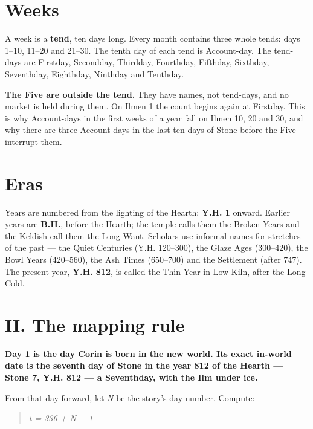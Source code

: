 \documentclass{design/chronicle}
\begin{document}
\section*{Weeks}

A week is a \textbf{tend}, ten days long. Every month contains three whole tends: days 1–10, 11–20 and 21–30. The tenth day of each tend is Account-day. The tend-days are Firstday, Secondday, Thirdday, Fourthday, Fifthday, Sixthday, Seventhday, Eighthday, Ninthday and Tenthday.

\textbf{The Five are outside the tend.} They have names, not tend-days, and no market is held during them. On Ilmen 1 the count begins again at Firstday. This is why Account-days in the first weeks of a year fall on Ilmen 10, 20 and 30, and why there are three Account-days in the last ten days of Stone before the Five interrupt them.

\section*{Eras}

Years are numbered from the lighting of the Hearth: \textbf{Y.H. 1} onward. Earlier years are \textbf{B.H.}, before the Hearth; the temple calls them the Broken Years and the Keldish call them the Long Want. Scholars use informal names for stretches of the past — the Quiet Centuries (Y.H. 120–300), the Glaze Ages (300–420), the Bowl Years (420–560), the Ash Times (650–700) and the Settlement (after 747). The present year, \textbf{Y.H. 812}, is called the Thin Year in Low Kiln, after the Long Cold.

\CRrule

\section*{II. The mapping rule}

\textbf{Day 1 is the day Corin is born in the new world. Its exact in-world date is the seventh day of Stone in the year 812 of the Hearth — Stone 7, Y.H. 812 — a Seventhday, with the Ilm under ice.}

From that day forward, let \emph{N} be the story’s day number. Compute:

\begin{quote}\itshape \emph{t} = 336 + \emph{N} − 1\end{quote}

\begin{quote}\itshape \end{quote}
\end{document}
